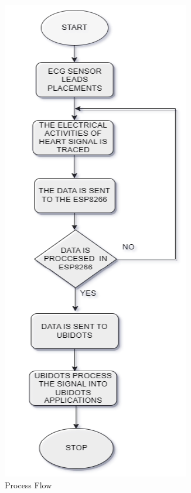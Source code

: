  \begin{figure}[htbp]
    \centering
     \includegraphics[width=0.6\linewidth]{C_chap/fig7.png}
\caption{ Process Flow}
 \end{figure}
